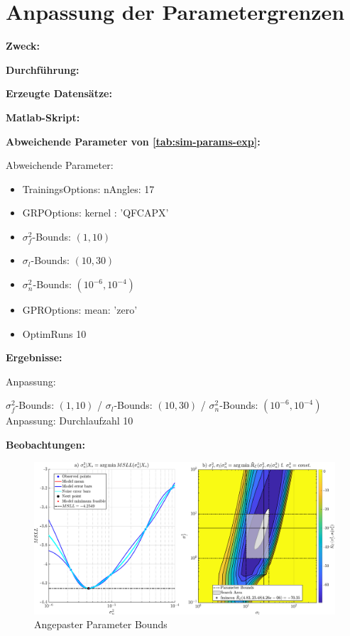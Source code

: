 %

\section{Anpassung der Parametergrenzen}\label{sec:exp4}

\textbf{Zweck:}

\textbf{Durchführung:}

\textbf{Erzeugte Datensätze:}

\textbf{Matlab-Skript:}

\textbf{Abweichende Parameter von \autoref{tab:sim-params-exp}:}

Abweichende Parameter:

\begin{itemize}
	\item TrainingsOptions: nAngles: 17
	\item GRPOptions: kernel : 'QFCAPX'
	\item $\sigma_f^2$-Bounds: $(1,10)$
	\item $\sigma_l$-Bounds: $(10,30)$
	\item $\sigma_n^2$-Bounds: $(10^{-6},10^{-4})$
	\item GPROptions: mean: 'zero'
	\item OptimRuns 10
\end{itemize}


\textbf{Ergebnisse:}

Anpassung:

$\sigma_f^2$-Bounds: $(1, 10)$ / $\sigma_l$-Bounds: $(10, 30)$ / $\sigma_n^2$-Bounds: $(10^{-6}, 10^{-4})$
Anpassung: Durchlaufzahl 10

\textbf{Beobachtungen:}


\clearpage
\begin{landscape}
\begin{figure}[tbph]
	\centering
	\includegraphics[width=\linewidth]{chapters/images/4-EuOExp/QFCAPX-Z-N17-Bounds}
	\caption[Angepaster Parameter Bounds]{Angepaster Parameter Bounds}
	\label{fig:qfcapx-z-n17-bounds}
\end{figure}
\end{landscape}


